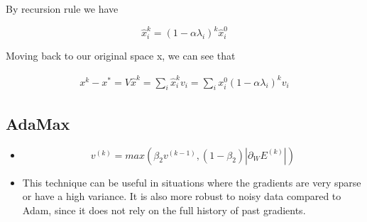 \documentclass{article}
\begin{document}
By recursion rule we have

\begin{equation*}
    \hat{x}_i^k = (1 - \alpha \lambda_i)^k\hat{x}_i^0
\end{equation*}

Moving back to our original space x, we can see that

\begin{align*}
    x^k - x^* = V\hat{x}^k = \sum_{i} \hat{x}_i^k v_i = \sum_{i} x_i^0 (1 - \alpha \lambda_i)^kv_i  
\end{align*}

\subsection{AdaMax}
\begin{itemize}
    \item 
    \begin{equation*}
        v^{(k)} = max(\beta_2v^{(k - 1)}, (1 - \beta_2)|\partial_W E^{(k)}|)
    \end{equation*}

    \item 
    This technique can be useful in situations where 
    the gradients are very sparse or have a high variance. It is 
    also more robust to noisy data compared to Adam,
    since it does not rely on the full history of past gradients.
\end{itemize}
\end{document}
